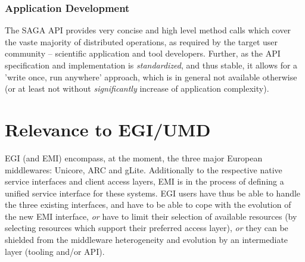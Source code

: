 \documentclass[12pt]{article}
\newcommand{\I}[1]{\textit{#1}}
\begin{document}
\subsubsection*{Application Development}


  The SAGA API provides very concise and high level method calls which
  cover the vaste majority of distributed operations, as required by
  the target user community -- scientific application and tool
  developers.  Further, as the API specification and implementation is
  \I{standardized}, and thus stable, it allows for a 'write once, run
  anywhere' approach, which is in general not available otherwise (or
  at least not without \I{significantly} increase of application
  complexity).



   
\section{Relevance to EGI/UMD}

EGI (and EMI) encompass, at the moment, the three major European
middlewares: Unicore, ARC and gLite.  Additionally to the respective
native service interfaces and client access layers, EMI is in the
process of defining a unified service interface for these systems.
EGI users have thus be able to handle the three existing interfaces,
and have to be able to cope with the evolution of the new EMI
interface, \I{or} have to limit their selection of available resources
(by selecting resources which support their preferred access layer),
\I{or} they can be shielded from the middleware heterogeneity and
evolution by an intermediate layer (tooling and/or API).
 
\end{document}
